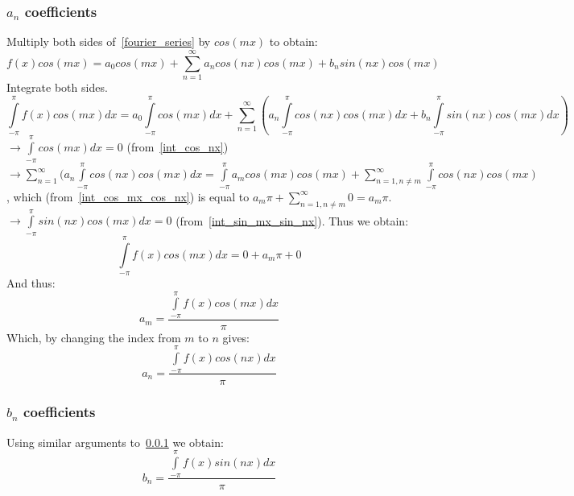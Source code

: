 \documentclass[a4paper]{article}
\numberwithin{equation}{subsection}
\begin{document}
\subsubsection{$a_n$ coefficients}\label{an_coefficient}
Multiply both sides of~\cref{fourier_series} by $cos(m x)$ to obtain:
$$f(x) cos(m x)= a_0 cos(m x) + \sum\limits_{n=1}^{\infty} a_n cos(n x) cos(m x) + b_n sin(n x) cos(m x)$$
Integrate both sides.
$$\int \limits_{-\pi}^{\pi}f(x) cos(m x) dx= a_0 \int \limits_{-\pi}^{\pi} cos(m x) dx 
+ \sum\limits_{n=1}^{\infty} (
a_n \int \limits_{-\pi}^{\pi}cos(n x) cos(m x) dx
+ b_n \int \limits_{-\pi}^{\pi} sin(n x) cos(m x) dx
)$$
$\rightarrow \int \limits_{-\pi}^{\pi} cos(m x) dx=0$ (from~\cref{int_cos_nx})\\
$\rightarrow \sum\limits_{n=1}^{\infty} (
a_n \int \limits_{-\pi}^{\pi}cos(n x) cos(m x) dx = \int \limits_{-\pi}^{\pi} a_m cos(m x) cos (m x) + \sum \limits_{n=1, n\neq m}^{\infty} \int \limits_{-\pi}^{\pi} cos(n x) cos(m x)$, which (from~\cref{int_cos_mx_cos_nx}) is equal to $a_m \pi + \sum \limits_{n=1, n\neq m}^{\infty} 0 = a_m \pi$.\\
$\rightarrow \int \limits_{-\pi}^{\pi} sin(n x) cos(m x) dx = 0$ (from~\cref{int_sin_mx_sin_nx}).
Thus we obtain:
$$\int \limits_{-\pi}^{\pi}f(x) cos(m x) dx = 0+a_m \pi + 0$$
And thus:
$$a_m = \frac{\int \limits_{-\pi}^{\pi} f(x) cos(m x) dx}{\pi}$$
Which, by changing the index from $m$ to $n$ gives:
\begin{equation}\label{an}
a_n = \frac{\int \limits_{-\pi}^{\pi} f(x) cos(n x) dx}{\pi}
\end{equation}

\subsubsection{$b_n$ coefficients}\label{bn_coefficient}
Using similar arguments to~\cref{an_coefficient} we obtain:
\begin{equation}\label{bn}
b_n = \frac{\int \limits_{-\pi}^{\pi} f(x) sin(n x) dx}{\pi}
\end{equation}
\end{document}
